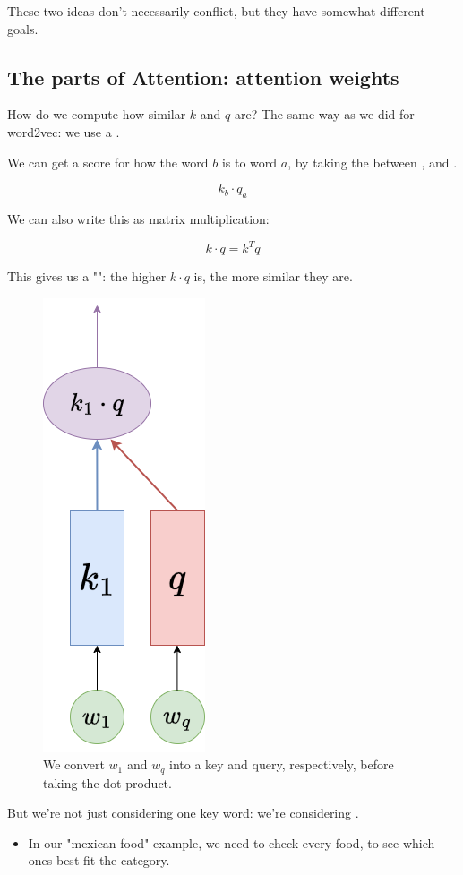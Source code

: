         These two ideas don't necessarily conflict, but they have somewhat different goals.

    \phantom{}

    \subsection{The parts of Attention: attention weights}

        How do we compute how similar $k$ and $q$ are? The same way as we did for word2vec: we use a .\\

        \begin{kequation}
            We can get a score for how  the word $b$ is to word $a$, by taking the  between , and .

            \begin{equation*}
                k_b \cdot q_a  
            \end{equation*}

            We can also write this as matrix multiplication:

            \begin{equation*}
                k \cdot q = k^Tq
            \end{equation*}
        \end{kequation}

        This gives us a "": the higher $k \cdot q$ is, the more similar they are.

        \begin{figure}[H]
            \centering
            \includegraphics[width=0.1\linewidth]{images/transformers_images/k_dot_q.png}
            \caption*{We convert $w_1$ and $w_q$ into a key and query, respectively, before taking the dot product.}
        \end{figure}

        But we're not just considering one key word: we're considering .

        \begin{itemize}
            \item In our "mexican food" example, we need to check every food, to see which ones best fit the category.
        \end{itemize}

